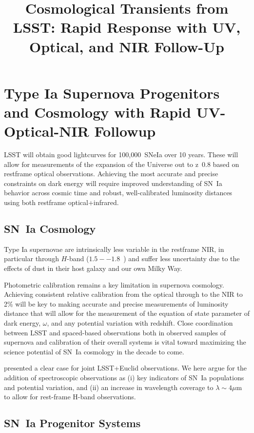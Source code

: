\title{Cosmological Transients from LSST: Rapid Response with UV, Optical, and NIR Follow-Up}

\section{Type Ia Supernova Progenitors and Cosmology with Rapid UV-Optical-NIR Followup}

LSST will obtain good lightcurves for 100,000~SNeIa over 10 years.  These will allow for measurements of the expansion of the Universe out to z~0.8 based on restframe optical observations.  Achieving the most accurate and precise constraints on dark energy will require improved understanding of SN~Ia behavior across cosmic time and robust, well-calibrated luminosity distances using both restframe optical+infrared.

\subsection{SN~Ia Cosmology}

Type Ia supernovae are intrinsically less variable in the restframe NIR, in particular through $H$-band ($1.5--1.8$~\mu) \citep{Krisciunas, Wood-Vasey, CSP} and suffer less uncertainty due to the effects of dust in their host galaxy and our own Milky Way.

Photometric calibration remains a key limitation in supernova cosmology\citep[c.f.][]{Scolnic}.  Achieving consistent relative calibration from the optical through to the NIR to 2\% will be key to making accurate and precise measurements of luminosity distance that will allow for the measurement of the equation of state parameter of dark energy, $\omega$, and any potential variation with redshift.  Close coordination between LSST and spaced-based observations both in observed samples of supernova and calibration of their overall systems is vital toward maximizing the science potential of SN~Ia cosmology in the decade to come. 

\citet{Astier16} presented a clear case for joint LSST+Euclid observations.  We here argue for the addition of spectroscopic observations as (i) key indicators of SN~Ia populations and potential variation, and (ii) an increase in wavelength coverage to $\lambda\sim4\mu$m to allow for rest-frame H-band observations.

\subsection{SN~Ia Progenitor Systems}

